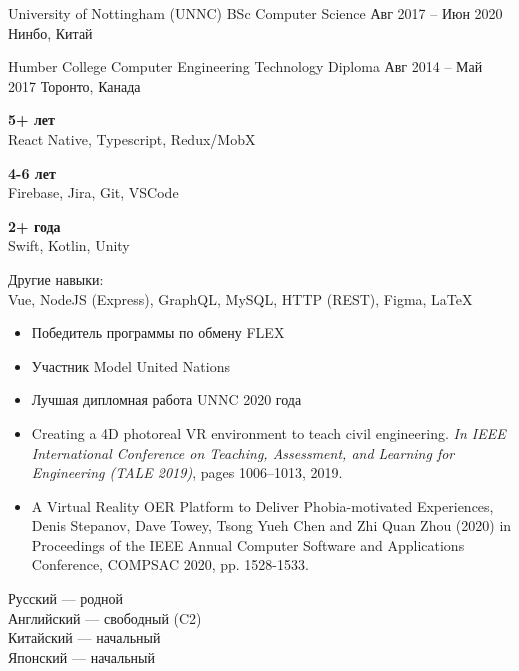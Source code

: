 \cvevent
  {University of Nottingham (UNNC)}
  {BSc Computer Science}
  {Авг 2017 -- Июн 2020}
  {Нинбо, Китай}
\divider

\cvevent
  {Humber College}
  {Computer Engineering Technology Diploma}
  {Авг 2014 -- Май 2017}
  {Торонто, Канада}

\textbf{5+ лет}
\\
React Native, Typescript, Redux/MobX

\vspace{0.2cm}
\textbf{4-6 лет}
\\
Firebase, Jira, Git, VSCode

\vspace{0.2cm}
\textbf{2+ года}
\\
Swift, Kotlin, Unity

\vspace{0.5cm}
Другие навыки: \\
Vue, NodeJS (Express), GraphQL, MySQL, HTTP (REST), Figma, \LaTeX

\begin{itemize}
\item Победитель программы по обмену FLEX
\item Участник Model United Nations
\item Лучшая дипломная работа UNNC 2020 года
\end{itemize}

\begin{itemize}
    \item Creating a 4D photoreal VR environment to teach civil engineering. \textit{In IEEE International Conference on Teaching, Assessment, and Learning for Engineering (TALE 2019)}, pages 1006--1013, 2019.
    \item A Virtual Reality OER Platform to Deliver Phobia-motivated Experiences, Denis Stepanov, Dave Towey, Tsong Yueh Chen and Zhi Quan Zhou (2020) in Proceedings of the IEEE Annual Computer Software and Applications Conference, COMPSAC 2020, pp. 1528-1533.
\end{itemize}

Русский --- родной\\
Английский --- свободный (C2)\\
Китайский --- начальный\\
Японский --- начальный
